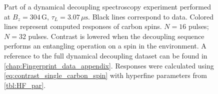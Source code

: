 \begin{figure}[htbp]
\begin{subfigure}[t]{\textwidth}
    \caption{}
    \label{fig:FP32}
    \end{subfigure}
    \caption{Part of a dynamical decoupling spectroscopy experiment performed at $B_z = 304\,\mathrm{G}$, $\tau_L =3.07 \, \mu \mathrm{s} $.
    Black lines correspond to data. Colored lines represent computed responses of carbon spins.
     $N = 16$ pulses;  $N=32$ pulses.
    Contrast is lowered when the decoupling sequence performs an entangling operation on a spin in the environment.
    A reference to the full dynamical decoupling dataset can be found in \cref{chap:Fingerprint_data_appendix}.
    Responses were calculated using \cref{eq:contrast_single_carbon_spin} with hyperfine parameters from \cref{tbl:HF_par}. }
    \label{fig:FP}
\end{figure}




